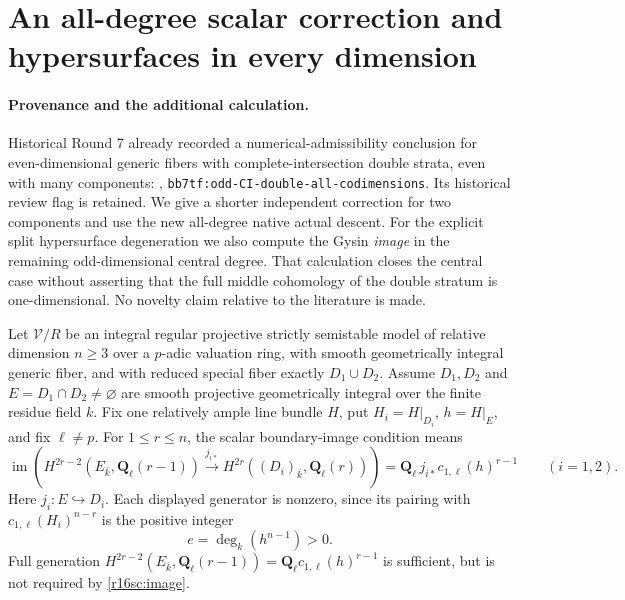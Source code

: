 \section{An all-degree scalar correction and hypersurfaces in every dimension}
\label{r16sc:section}

\paragraph{Provenance and the additional calculation.}
Historical Round 7 already recorded a numerical-admissibility conclusion for
even-dimensional generic fibers with complete-intersection double
strata, even with many components:
,
\texttt{bb7tf:odd-CI-double-all-codimensions}. Its historical
review flag is retained. We give a shorter independent correction
for two components and use the new all-degree native actual descent.
For the explicit split hypersurface degeneration we also compute
the Gysin \emph{image} in the remaining odd-dimensional central
degree. That calculation closes the central case without asserting
that the full middle cohomology of the double stratum is one-dimensional.
No novelty claim relative to the literature is made.

\begin{definition}
\label{r16sc:definition}
Let $\mathcal V/R$ be an integral regular projective strictly
semistable model of relative dimension $n\geq3$ over a $p$-adic
valuation ring, with smooth geometrically integral generic fiber,
and with reduced special fiber exactly $D_1\cup D_2$.
Assume $D_1,D_2$ and $E=D_1\cap D_2\ne\varnothing$ are smooth
projective geometrically integral over the finite residue field $k$.
Fix one relatively ample line bundle $H$, put $H_i=H|_{D_i}$,
$h=H|_E$, and fix $\ell\ne p$.
For $1\leq r\leq n$, the scalar boundary-image condition means
\[
 \operatorname{im}\left(
 H^{2r-2}(E_{\bar k},\mathbf Q_\ell(r-1))
   \xrightarrow{j_{i*}}
 H^{2r}((D_i)_{\bar k},\mathbf Q_\ell(r))\right)
       =\mathbf Q_\ell\,j_{i*}c_{1,\ell}(h)^{r-1}
       \qquad(i=1,2).
 \tag{SC16.1}\label{r16sc:image}
\]
Here $j_i:E\hookrightarrow D_i$. Each displayed generator is
nonzero, since its pairing with $c_{1,\ell}(H_i)^{n-r}$ is
the positive integer
\[
                           e=\deg_k(h^{n-1})>0.
 \tag{SC16.2}\label{r16sc:degree}
\]
Full generation $H^{2r-2}(E_{\bar k},\mathbf Q_\ell(r-1))
=\mathbf Q_\ell c_{1,\ell}(h)^{r-1}$ is sufficient, but is
not required by \eqref{r16sc:image}.
\end{definition}

